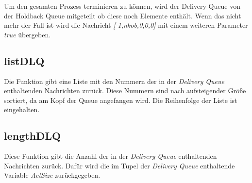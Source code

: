 Um den gesamten Prozess terminieren zu können, wird der Delivery Queue von der Holdback Queue mitgeteilt ob diese noch Elemente enthält. Wenn das nicht mehr der Fall ist wird die Nachricht \textit{[-1,nkob,0,0,0]} mit einem weiteren Parameter \textit{true} übergeben.

\subsection{listDLQ}

Die Funktion gibt eine Liste mit den Nummern der in der \textit{Delivery Queue} enthaltenden Nachrichten zurück. Diese Nummern sind nach aufsteigender Größe sortiert, da am Kopf der Queue angefangen wird. Die Reihenfolge der Liste ist eingehalten. 

\subsection{lengthDLQ}

Diese Funktion gibt die Anzahl der in der \textit{Delivery Queue} enthaltenden Nachrichten zurück. Dafür wird die im Tupel der \textit{Delivery Queue} enthaltende Variable \textit{ActSize} zurückgegeben. 